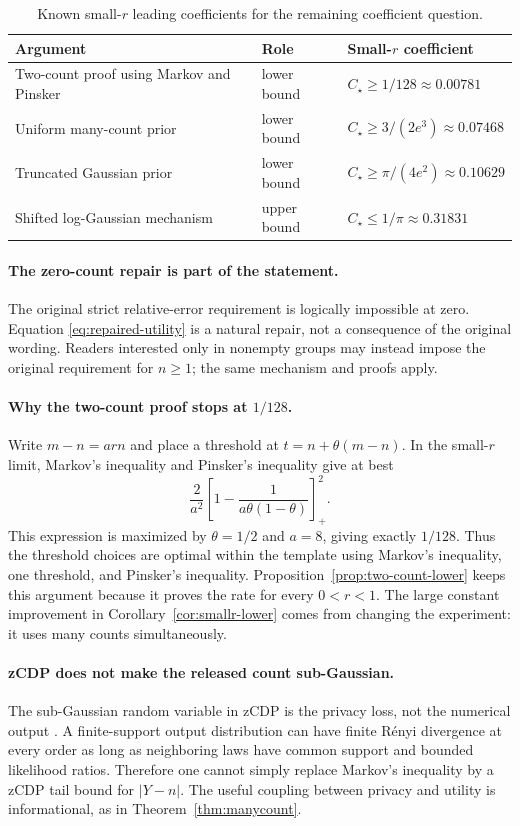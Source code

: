 \documentclass[11pt]{article}
\newcommand{\pos}[1]{\left[#1\right]_{+}}
\theoremstyle{definition}
\begin{document}
\begin{table}[H]
\centering
\small
\begin{tabularx}{\textwidth}{@{}Y L{0.17\textwidth} L{0.25\textwidth}@{}}
\toprule
\textbf{Argument} & \textbf{Role} & \textbf{Small-$r$ coefficient} \\
\midrule
Two-count proof using Markov and Pinsker & lower bound & $C_\star\ge 1/128\approx0.00781$ \\
Uniform many-count prior & lower bound & $C_\star\ge 3/(2e^3)\approx0.07468$ \\
Truncated Gaussian prior & lower bound & $C_\star\ge \pi/(4e^2)\approx0.10629$ \\
Shifted log-Gaussian mechanism & upper bound & $C_\star\le 1/\pi\approx0.31831$ \\
\bottomrule
\end{tabularx}
\caption{Known small-$r$ leading coefficients for the remaining coefficient question.}
\label{tab:constants}
\end{table}

\paragraph{The zero-count repair is part of the statement.}
The original strict relative-error requirement is logically impossible at zero. Equation \eqref{eq:repaired-utility} is a natural repair, not a consequence of the original wording. Readers interested only in nonempty groups may instead impose the original requirement for $n\ge1$; the same mechanism and proofs apply.

\paragraph{Why the two-count proof stops at $1/128$.}
Write $m-n=arn$ and place a threshold at $t=n+\theta(m-n)$. In the small-$r$ limit, Markov's inequality and Pinsker's inequality give at best
\[
  \frac{2}{a^2}
  \pos{
    1-\frac{1}{a\theta(1-\theta)}
  }^2.
\]
This expression is maximized by $\theta=1/2$ and $a=8$, giving exactly $1/128$. Thus the threshold choices are optimal within the template using Markov's inequality, one threshold, and Pinsker's inequality. Proposition~\ref{prop:two-count-lower} keeps this argument because it proves the rate for every $0<r<1$. The large constant improvement in Corollary~\ref{cor:smallr-lower} comes from changing the experiment: it uses many counts simultaneously.

\paragraph{zCDP does not make the released count sub-Gaussian.}
The sub-Gaussian random variable in zCDP is the privacy loss, not the numerical output \citep{BunSteinke2016}. A finite-support output distribution can have finite R\'enyi divergence at every order as long as neighboring laws have common support and bounded likelihood ratios. Therefore one cannot simply replace Markov's inequality by a zCDP tail bound for $|Y-n|$. The useful coupling between privacy and utility is informational, as in Theorem~\ref{thm:manycount}.
\end{document}
